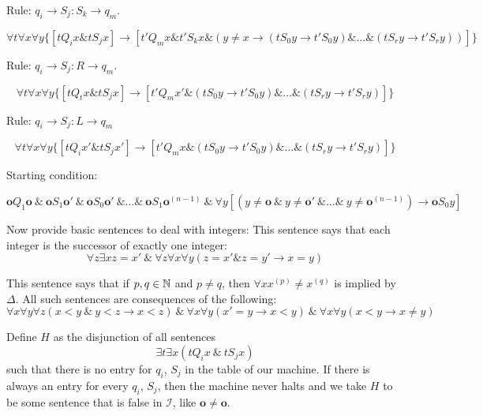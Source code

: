 Rule: $q_i \rightarrow S_j:S_k \rightarrow q_m$.

\[\forall t\forall x\forall y \{[tQ_ix\& tS_jx] \rightarrow [t'Q_mx\& t'S_kx \& (y\ne x \rightarrow (tS_0y\rightarrow t'S_0y)\&\dots\&(tS_ry\rightarrow t'S_ry))]\}\]

Rule: $q_i\rightarrow S_j:R\rightarrow q_m$.

\[\forall t\forall x\forall y\{[tQ_tx\&tS_jx]\rightarrow [t'Q_mx' \& (tS_0y\rightarrow t'S_0y)\&\dots\&(tS_ry\rightarrow t'S_ry)]\}\]

Rule: $q_i\rightarrow S_j:L \rightarrow q_m$

\[\forall t \forall x \forall y \{[tQ_ix' \& tS_jx']\rightarrow [t'Q_mx\& (tS_0y\rightarrow t'S_0y)\&\dots\&(tS_ry\rightarrow t'S_ry)]\}\]

Starting condition:

\newcommand{\z}{\mathbf{o}}

\[\z Q_1 \z\ \&\ \z S_1\z'\ \&\ \z S_0\z '\ \&\dots\&\ \z S_1\z^{(n-1)}\ \&\ \forall y [(y\ne \z\ \&\ y\ne \z'\ \&\dots\&\ y\ne \z^{(n-1)}) \rightarrow \z S_0y]\]

Now provide basic sentences to deal with integers:
This sentence says that each integer is the successor of exactly one integer:
\[\forall z\exists x z = x'\ \& \ \forall z\forall x\forall y (z=x'\&z=y'\rightarrow x=y)\]

This sentence says that if $p,q\in\mathbb{N}$ and $p\ne q$, then $\forall x x^{(p)}\ne x^{(q)}$ is implied by $\Delta$. All such sentences are consequences of the following:
\[\forall x\forall y\forall z (x < y\ \&\ y < z\rightarrow x<z)\ \&\ \forall x\forall y(x'=y\rightarrow x<y)\ \&\ \forall x\forall y(x<y\rightarrow x\ne y)\]

Define $H$ as the disjunction of all sentences
\[\exists t\exists x (tQ_i x\ \&\ tS_jx)\]
such that there is no entry for $q_i$, $S_j$ in the table of our machine. If there is always an entry for every $q_i$, $S_j$, then the machine never halts and we take $H$ to be some sentence that is false in $\mathscr{I}$, like $\z\ne \z$.

